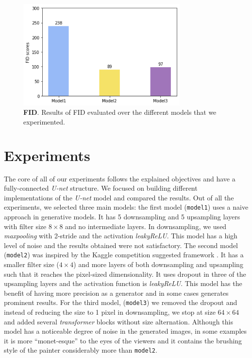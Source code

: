 \documentclass[10pt,twocolumn,letterpaper]{article}
\begin{document}
\begin{figure}
	\includegraphics[width=23em]{fid.png}
	\caption{\textbf{FID}. Results of FID evaluated over the different models that we experimented.}
	\label{figure:fid}
\end{figure}

\section{Experiments}
The core of all of our experiments follows the explained objectives and have a fully-connected \textit{U-net} structure. We focused on building different implementations of the \textit{U-net} model and compared the results. Out of all the experiments, we selected three main models: the first model (\texttt{model1}) uses a naive approach in generative models. It has 5 downsampling and 5 upsampling layers with filter size $8 \times 8$ and no intermediate layers. In downsampling, we used \textit{maxpooling} with 2-stride and the activation \textit{leakyReLU}. This model has a high level of noise and the results obtained were not satisfactory. The second model (\texttt{model2}) was inspired by the Kaggle competition suggested framework \cite{kaggle}. It has a smaller filter size ($4 \times 4$) and more layers of both downsampling and upsampling such that it reaches the pixel-sized dimensionality. It uses dropout in three of the upsampling layers and the activation function is \textit{leakyReLU}. This model has the benefit of having more precision as a generator and in some cases generates prominent results. For the third model, (\texttt{model3}) we removed the dropout and instead of reducing the size to 1 pixel in downsampling, we stop at size $64 \times 64$ and added several \textit{transformer} blocks without size alternation. Although this model has a noticeable degree of noise in the generated images, in some examples it is more “monet-esque” to the eyes of the viewers and it contains the brushing style of the painter considerably more than \texttt{model2}. 
\end{document}
